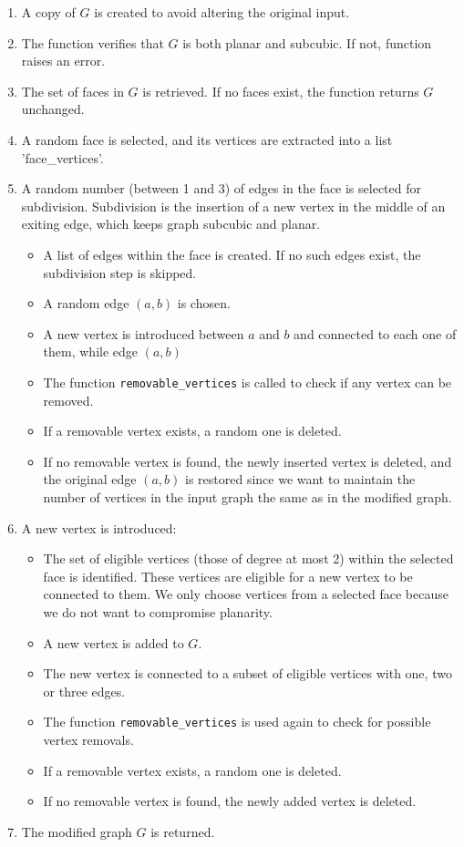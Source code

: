 \documentclass[12pt,a4paper]{amsart}
\theoremstyle{definition}
\theoremstyle{plain}
\begin{document}
\begin{enumerate}
    \item A copy of \( G \) is created to avoid altering the original input.
    \item The function verifies that \( G \) is both planar and subcubic. If not, function raises an error.
    \item The set of faces in \( G \) is retrieved. If no faces exist, the function returns \( G \) unchanged.
    \item A random face is selected, and its vertices are extracted into a list \\
    'face\_vertices'.
    \item A random number (between 1 and 3) of edges in the face is selected for subdivision. Subdivision is the insertion 
    of a new vertex in the middle of an exiting edge, which keeps graph subcubic and planar.
    \begin{itemize}
        \item A list of edges within the face is created. If no such edges exist, the subdivision step is skipped.
        \item A random edge \( (a, b) \) is chosen.
        \item A new vertex is introduced between \( a \) and \( b \) and connected to each one of them, while edge 
        \( (a, b) \) 
        \item The function \texttt{removable\_vertices} is called to check if any vertex can be removed.
        \item If a removable vertex exists, a random one is deleted.
        \item If no removable vertex is found, the newly inserted vertex is deleted, and the original edge \( (a, b) \) 
        is restored since we want to maintain the number of vertices in the input graph the same as in the modified graph.
    \end{itemize}
    \item A new vertex is introduced:
    \begin{itemize}
        \item The set of eligible vertices (those of degree at most 2) within the selected face is identified. These 
        vertices are eligible for a new vertex to be connected to them. We only choose vertices from a selected face
        because we do not want to compromise planarity.
        \item A new vertex is added to \( G \).
        \item The new vertex is connected to a subset of eligible vertices with one, two or three edges.
        \item The function \texttt{removable\_vertices} is used again to check for possible vertex removals.
        \item If a removable vertex exists, a random one is deleted.
        \item If no removable vertex is found, the newly added vertex is deleted.
    \end{itemize}
    \item The modified graph \( G \) is returned.
\end{enumerate}
\end{document}

